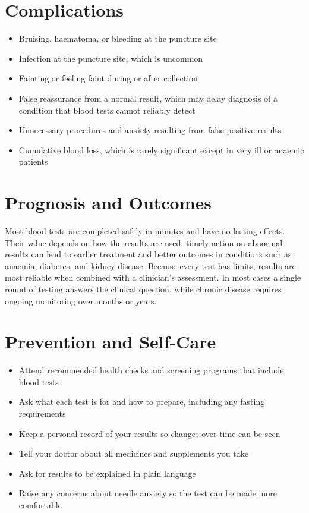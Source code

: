 \section*{Complications}
\begin{itemize}
    \item Bruising, haematoma, or bleeding at the puncture site
    \item Infection at the puncture site, which is uncommon
    \item Fainting or feeling faint during or after collection
    \item False reassurance from a normal result, which may delay diagnosis of a condition that blood tests cannot reliably detect
    \item Unnecessary procedures and anxiety resulting from false-positive results
    \item Cumulative blood loss, which is rarely significant except in very ill or anaemic patients
\end{itemize}

\section*{Prognosis and Outcomes}
Most blood tests are completed safely in minutes and have no lasting effects. Their value depends on how the results are used: timely action on abnormal results can lead to earlier treatment and better outcomes in conditions such as anaemia, diabetes, and kidney disease. Because every test has limits, results are most reliable when combined with a clinician's assessment. In most cases a single round of testing answers the clinical question, while chronic disease requires ongoing monitoring over months or years.

\section*{Prevention and Self-Care}
\begin{itemize}
    \item Attend recommended health checks and screening programs that include blood tests
    \item Ask what each test is for and how to prepare, including any fasting requirements
    \item Keep a personal record of your results so changes over time can be seen
    \item Tell your doctor about all medicines and supplements you take
    \item Ask for results to be explained in plain language
    \item Raise any concerns about needle anxiety so the test can be made more comfortable
\end{itemize}

